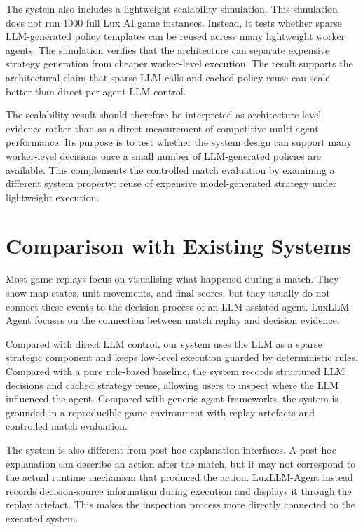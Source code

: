 \documentclass[11pt]{article}
\begin{document}
The system also includes a lightweight scalability simulation. This simulation does not run 1000 full Lux AI game instances. Instead, it tests whether sparse LLM-generated policy templates can be reused across many lightweight worker agents. The simulation verifies that the architecture can separate expensive strategy generation from cheaper worker-level execution. The result supports the architectural claim that sparse LLM calls and cached policy reuse can scale better than direct per-agent LLM control.

The scalability result should therefore be interpreted as architecture-level evidence rather than as a direct measurement of competitive multi-agent performance. Its purpose is to test whether the system design can support many worker-level decisions once a small number of LLM-generated policies are available. This complements the controlled match evaluation by examining a different system property: reuse of expensive model-generated strategy under lightweight execution.

\section{Comparison with Existing Systems}

Most game replays focus on visualising what happened during a match. They show map states, unit movements, and final scores, but they usually do not connect these events to the decision process of an LLM-assisted agent. LuxLLM-Agent focuses on the connection between match replay and decision evidence.

Compared with direct LLM control, our system uses the LLM as a sparse strategic component and keeps low-level execution guarded by deterministic rules. Compared with a pure rule-based baseline, the system records structured LLM decisions and cached strategy reuse, allowing users to inspect where the LLM influenced the agent. Compared with generic agent frameworks, the system is grounded in a reproducible game environment with replay artefacts and controlled match evaluation.

The system is also different from post-hoc explanation interfaces. A post-hoc explanation can describe an action after the match, but it may not correspond to the actual runtime mechanism that produced the action. LuxLLM-Agent instead records decision-source information during execution and displays it through the replay artefact. This makes the inspection process more directly connected to the executed system.
\end{document}
